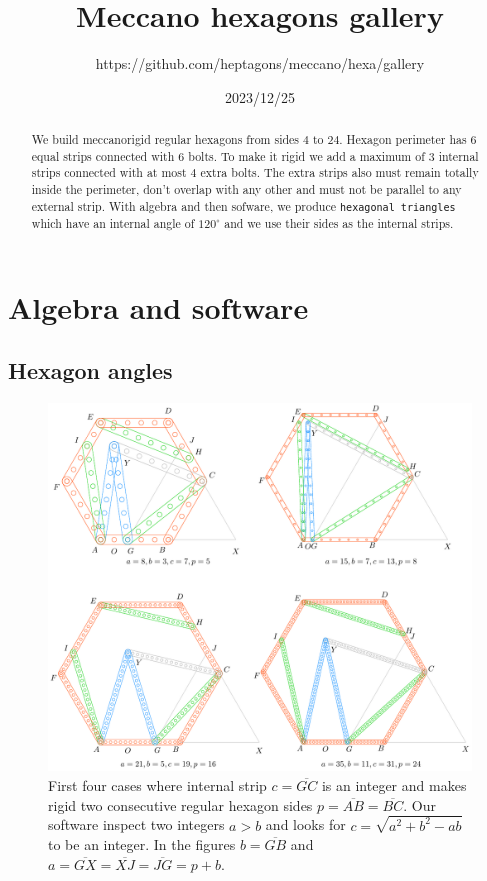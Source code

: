 \documentclass[11pt]{article}
\title{Meccano hexagons gallery}
\author{https://github.com/heptagons/meccano/hexa/gallery}
\date{2023/12/25}
\begin{document}
\maketitle
\begin{abstract}
We build meccano\meccanoref rigid regular hexagons from sides $4$ to $24$. Hexagon perimeter has $6$ equal strips connected with $6$ bolts. To make it rigid we add a maximum of $3$ internal strips connected with at most $4$ extra bolts. The extra strips also must remain totally inside the perimeter, don't overlap with any other and must not be parallel to any external strip. With algebra and then sofware, we produce \texttt{hexagonal triangles} which have an internal angle of $120^\circ$ and we use their sides as the internal strips.
\end{abstract}

\section{Algebra and software}

\subsection{Hexagon angles}

\begin{figure}[h]
\centering
\includegraphics[scale=0.9]{build/hexa-builder-a}
\caption{First four cases where internal strip $c = \overline{GC}$ is an integer and makes rigid two consecutive regular hexagon sides $p = \overline{AB} = \overline{BC}$. Our software inspect two integers $a > b$ and looks for $c = \sqrt{a^2+b^2-ab}$ to be an integer. In the figures $b = \overline{GB}$ and $a = \overline{GX} = \overline{XJ} = \overline{JG} = p + b$. }
\label{fig:builder-a}
\end{figure}
\end{document}
